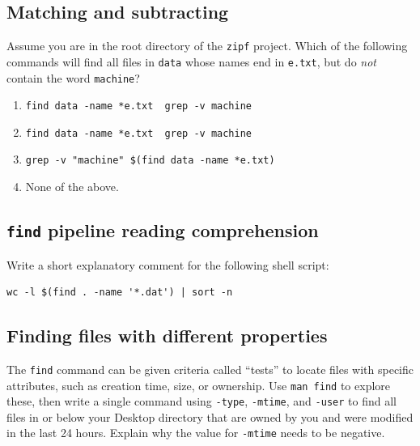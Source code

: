 \documentclass[
]{krantz}
\providecommand{\tightlist}{%
  \setlength{\itemsep}{0pt}\setlength{\parskip}{0pt}}
\begin{document}
\hypertarget{bash-advanced-ex-match-subtract}{%
\subsection{Matching and subtracting}\label{bash-advanced-ex-match-subtract}}

Assume you are in the root directory of the \texttt{zipf} project.
Which of the following commands will find all files in \texttt{data} whose names end in \texttt{e.txt},
but do \emph{not} contain the word \texttt{machine}?

\begin{enumerate}
\def\labelenumi{\arabic{enumi}.}
\tightlist
\item
  \texttt{find\ data\ -name\ \textquotesingle{}*e.txt\textquotesingle{}\ \textbar{}\ grep\ -v\ machine}
\item
  \texttt{find\ data\ -name\ *e.txt\ \textbar{}\ grep\ -v\ machine}
\item
  \texttt{grep\ -v\ "machine"\ \$(find\ data\ -name\ \textquotesingle{}*e.txt\textquotesingle{})}
\item
  None of the above.
\end{enumerate}

\hypertarget{bash-advanced-ex-reading-find}{%
\subsection{\texorpdfstring{\texttt{find} pipeline reading comprehension}{find pipeline reading comprehension}}\label{bash-advanced-ex-reading-find}}

Write a short explanatory comment for the following shell script:

\begin{verbatim}
wc -l $(find . -name '*.dat') | sort -n
\end{verbatim}

\hypertarget{bash-advanced-ex-find-tests}{%
\subsection{Finding files with different properties}\label{bash-advanced-ex-find-tests}}

The \texttt{find} command can be given criteria called ``tests''
to locate files with specific attributes,
such as creation time, size, or ownership.
Use \texttt{man\ find} to explore these,
then write a single command using \texttt{-type}, \texttt{-mtime}, and \texttt{-user}
to find all files in or below your Desktop directory
that are owned by you and were modified in the last 24 hours.
Explain why the value for \texttt{-mtime} needs to be negative.
\end{document}
